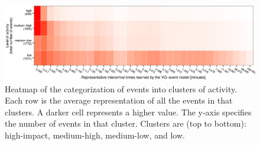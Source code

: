 \begin{figure}
  \includegraphics[width=\textwidth]{figures/high-activity/fig3}
  \caption[Heatmap of the categorization of events into clusters of
  activity.]{{Heatmap of the categorization of events into clusters of activity.
  Each row is the average representation of all the events in that clusters.  A
  darker cell represents a higher value. The y-axis specifies the number of
  events in that cluster. Clusters are (top to bottom): high-impact,
  medium-high, medium-low, and low.}}
  \label{fig:hi:heatmap}
\end{figure}